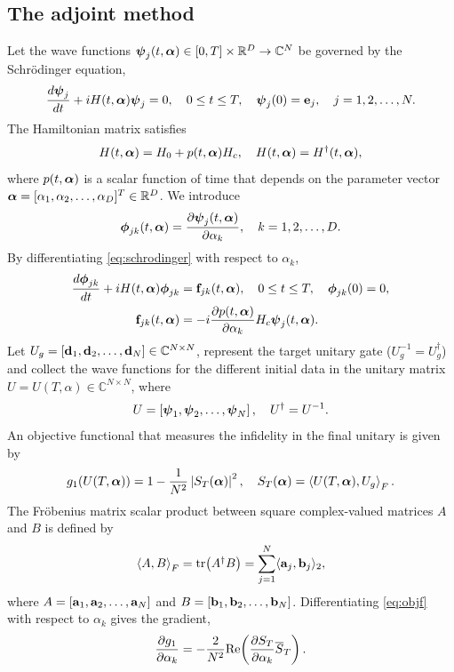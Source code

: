 \documentclass[11pt]{article}
\begin{document}
\subsection{The adjoint method} \label{subsec:Adjoint}
Let the wave functions $\boldsymbol{\psi}_j(t,\boldsymbol{\alpha})\in [0, T]\times \mathbb{R}^D \to \mathbb C^N$ be governed by the Schr\"odinger equation,
\begin{equation}\label{eq:schrodinger}
\frac{d \boldsymbol{\psi}_j}{dt} + iH(t,\boldsymbol{\alpha})\boldsymbol{\psi}_j=0,\quad 0\leq t\leq T, \quad \boldsymbol{\psi}_j(0)={\mathbf e}_j,\quad j=1,2,\ldots,N.
\end{equation}
The Hamiltonian matrix satisfies
\[
H(t,\boldsymbol{\alpha}) = H_0 + p(t,\boldsymbol{\alpha})H_c,\quad H(t,\boldsymbol{\alpha}) = H^\dag(t,\boldsymbol{\alpha}),
\]
where $p(t,\boldsymbol{\alpha})$ is a scalar function of time that depends on the parameter vector
$\boldsymbol{\alpha}=[\alpha_1,\alpha_2,\ldots,\alpha_D]^T\in \mathbb R^D$. We introduce
\[
\boldsymbol{\phi}_{jk}(t,\boldsymbol{\alpha}) = \frac{\partial \boldsymbol{\psi}_j (t,\boldsymbol{\alpha})}{\partial \alpha_k},\quad k=1,2,\ldots,D.
\]
By differentiating \eqref{eq:schrodinger} with respect to $\alpha_k$,
\begin{align}
\frac{d \phib_{jk}}{dt} + iH(t,\alphab)\phib_{jk}&=\fb_{jk}(t,\alphab),\quad 0\leq t\leq T, \quad
\phib_{jk}(0)=0,\label{eq_pert_schrodinger}\\
%
\fb_{jk}(t,\alphab) &= -i \frac{\p p(t,\alphab)}{\p \alpha_k} H_c \psib_j(t,\alphab).\label{eq_pert_force}
\end{align}
%
Let $U_g = [{\mathbf d}_1, {\mathbf d}_2, \ldots, {\mathbf d}_N]\in \mathbb{C}^{N\times N}$, represent the target unitary
gate ($U_g^{-1} = U_g^\dag$) and collect the wave functions for the different initial data in the
unitary matrix $U = U(T,\alpha) \in \mathbb C^{N\times N}$, where
%
\begin{equation}\label{eq:udef}
U = \left[ \boldsymbol{\psi}_1, \boldsymbol{\psi}_2, \ldots, \boldsymbol{\psi}_N \right],\quad U^\dag = U^{-1}.
\end{equation}
%
An objective functional that measures the infidelity in the final unitary is given by
%
\begin{equation}\label{eq:objf}
g_1(U(T,\alphab)) = 1 - \frac{1}{N^2} \left| S_T(\alphab) \right|^2,\quad S_T(\alphab) = \left\langle U(T,\alphab), U_g \right\rangle_F.
%
\end{equation}
The Fr\"obenius matrix scalar product between square complex-valued matrices $A$ and $B$ is defined by
\begin{equation}\label{eq:frobenius}
\left\langle A, B\right\rangle_F = \mbox{tr$\left( A^\dag B\right)$} = \sum_{j=1}^N \langle {\mathbf a}_j, {\mathbf b}_j\rangle_2,
\end{equation}
%
where $A=[{\mathbf a}_1, {\mathbf a}_2, \ldots, {\mathbf a}_N]$ and  $B=[{\mathbf b}_1, {\mathbf b}_2, \ldots, {\mathbf b}_N]$. Differentiating
%
\eqref{eq:objf} with respect to $\alpha_k$ gives the gradient,
\begin{equation}\label{eq:objgrad}
\frac{\partial g_1}{\partial \alpha_k} = - \frac{2}{N^2} {\rm Re}\! \left(\frac{\partial S_T}{\partial \alpha_k} \overline{S}_T \right).
\end{equation}
\end{document}
